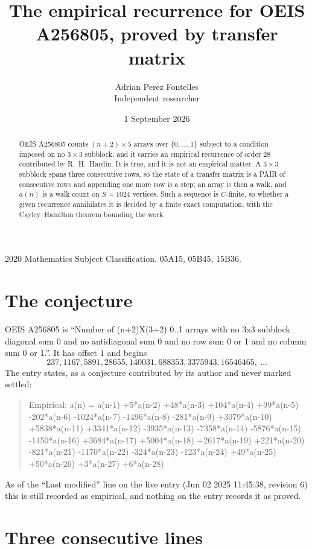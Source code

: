 \documentclass[11pt,a4paper]{article}
\title{The empirical recurrence for OEIS A256805, proved by transfer matrix}
\author{Adrian Perez Fontelles\\ \small Independent researcher}
\date{1 September 2026}
\theoremstyle{plain}
\theoremstyle{definition}
\begin{document}
\maketitle

\begin{abstract}
OEIS A256805 counts $(n+2)\times5$ arrays over $\{0,\dots,1\}$ subject to a condition imposed on
no $3\times3$ subblock, and it carries an empirical recurrence of order $28$
contributed by R.~H.~Hardin. It is true, and it is not an empirical matter. A $3\times3$
subblock spans three consecutive rows, so the state of a transfer matrix is a PAIR of
consecutive rows and appending one more row is a step; an array is then a walk, and
$a(n)$ is a walk count on $S=1024$ vertices. Such a sequence is $C$-finite, so whether a given
recurrence annihilates it is decided by a finite exact computation, with the Cayley--Hamilton
theorem bounding the work.
\end{abstract}

\noindent\small 2020 Mathematics Subject Classification. 05A15, 05B45, 15B36.\normalsize

\section{The conjecture}

OEIS A256805 is ``Number of (n+2)X(3+2) 0..1 arrays with no 3x3 subblock diagonal sum 0 and no antidiagonal sum 0 and no row sum 0 or 1 and no column sum 0 or 1.''. It has offset $1$ and begins
\[
237, 1167, 5891, 28655, 140031, 688353, 3375943, 16546465,\ \dots
\]
The entry states, as a conjecture contributed by its author and never marked settled:
\begin{quote}
Empirical: a(n) = a(n-1) +5*a(n-2) +48*a(n-3) +104*a(n-4) +99*a(n-5) -202*a(n-6) -1024*a(n-7) -1496*a(n-8) -281*a(n-9) +3079*a(n-10) +5838*a(n-11) +3341*a(n-12) -3935*a(n-13) -7358*a(n-14) -5876*a(n-15) -1450*a(n-16) +3684*a(n-17) +5004*a(n-18) +2617*a(n-19) +221*a(n-20) -821*a(n-21) -1170*a(n-22) -324*a(n-23) -123*a(n-24) +49*a(n-25) +50*a(n-26) +3*a(n-27) +6*a(n-28)
\end{quote}
As of the ``Last modified'' line on the live entry (Jun 02 2025 11:45:38, revision 6) this is still
recorded as empirical, and nothing on the entry records it as proved.

\section{Three consecutive lines}
\end{document}
